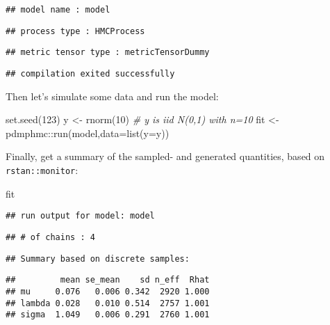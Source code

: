 \documentclass[
]{book}
\newenvironment{Shaded}{\begin{snugshade}}{\end{snugshade}}
\newcommand{\AttributeTok}[1]{\textcolor[rgb]{0.77,0.63,0.00}{#1}}
\newcommand{\CommentTok}[1]{\textcolor[rgb]{0.56,0.35,0.01}{\textit{#1}}}
\newcommand{\DecValTok}[1]{\textcolor[rgb]{0.00,0.00,0.81}{#1}}
\newcommand{\FunctionTok}[1]{\textcolor[rgb]{0.00,0.00,0.00}{#1}}
\newcommand{\NormalTok}[1]{#1}
\newcommand{\OtherTok}[1]{\textcolor[rgb]{0.56,0.35,0.01}{#1}}
\newcommand{\SpecialCharTok}[1]{\textcolor[rgb]{0.00,0.00,0.00}{#1}}
\begin{document}
\begin{verbatim}
## model name : model
\end{verbatim}

\begin{verbatim}
## process type : HMCProcess
\end{verbatim}

\begin{verbatim}
## metric tensor type : metricTensorDummy
\end{verbatim}

\begin{verbatim}
## compilation exited successfully
\end{verbatim}

Then let's simulate some data and run the model:

\begin{Shaded}
\begin{Highlighting}[]
\FunctionTok{set.seed}\NormalTok{(}\DecValTok{123}\NormalTok{)}
\NormalTok{y }\OtherTok{\textless{}{-}} \FunctionTok{rnorm}\NormalTok{(}\DecValTok{10}\NormalTok{) }\CommentTok{\# y is iid N(0,1) with n=10}
\NormalTok{fit }\OtherTok{\textless{}{-}}\NormalTok{ pdmphmc}\SpecialCharTok{::}\FunctionTok{run}\NormalTok{(model,}\AttributeTok{data=}\FunctionTok{list}\NormalTok{(}\AttributeTok{y=}\NormalTok{y))}
\end{Highlighting}
\end{Shaded}

Finally, get a summary of the sampled- and generated quantities, based on \texttt{rstan::monitor}:

\begin{Shaded}
\begin{Highlighting}[]
\NormalTok{fit}
\end{Highlighting}
\end{Shaded}

\begin{verbatim}
## run output for model: model
\end{verbatim}

\begin{verbatim}
## # of chains : 4
\end{verbatim}

\begin{verbatim}
## Summary based on discrete samples:
\end{verbatim}

\begin{verbatim}
##         mean se_mean    sd n_eff  Rhat
## mu     0.076   0.006 0.342  2920 1.000
## lambda 0.028   0.010 0.514  2757 1.001
## sigma  1.049   0.006 0.291  2760 1.001
\end{verbatim}
\end{document}
